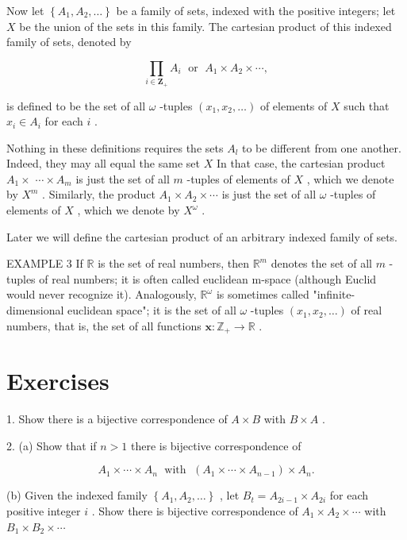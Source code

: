 Now let \(\left\{  {{A}_{1},{A}_{2},\ldots }\right\}\) be a family of sets, indexed with the positive integers; let \(X\) be the union of the sets in this family. The cartesian product of this indexed family of sets, denoted by

\[
\mathop{\prod }\limits_{{i \in  {\mathbf{Z}}_{ + }}}{A}_{i}\;\text{ or }\;{A}_{1} \times  {A}_{2} \times  \cdots ,
\]

is defined to be the set of all \(\omega\) -tuples \(\left( {{x}_{1},{x}_{2},\ldots }\right)\) of elements of \(X\) such that \({x}_{i} \in  {A}_{i}\) for each \(i\) .

Nothing in these definitions requires the sets \({A}_{l}\) to be different from one another. Indeed, they may all equal the same set \(X\) In that case, the cartesian product \({A}_{1} \times\)  \(\cdots  \times  {A}_{m}\) is just the set of all \(m\) -tuples of elements of \(X\) , which we denote by \({X}^{m}\) . Similarly, the product \({A}_{1} \times  {A}_{2} \times  \cdots\) is just the set of all \(\omega\) -tuples of elements of \(X\) , which we denote by \({X}^{\omega }\) .

Later we will define the cartesian product of an arbitrary indexed family of sets.

EXAMPLE 3 If \(\mathbb{R}\) is the set of real numbers, then \({\mathbb{R}}^{m}\) denotes the set of all \(m\) -tuples of real numbers; it is often called euclidean m-space (although Euclid would never recognize it). Analogously, \({\mathbb{R}}^{\omega }\) is sometimes called "infinite-dimensional euclidean space"; it is the set of all \(\omega\) -tuples \(\left( {{x}_{1},{x}_{2},\ldots }\right)\) of real numbers, that is, the set of all functions \(\mathbf{x} : {\mathbb{Z}}_{ + } \rightarrow  \mathbb{R}\) .

\section*{Exercises}

1. Show there is a bijective correspondence of \(A \times  B\) with \(B \times  A\) .

2. (a) Show that if \(n > 1\) there is bijective correspondence of

\[
{A}_{1} \times  \cdots  \times  {A}_{n}\;\text{ with }\;\left( {{A}_{1} \times  \cdots  \times  {A}_{n - 1}}\right)  \times  {A}_{n}.
\]

(b) Given the indexed family \(\left\{  {{A}_{1},{A}_{2},\ldots }\right\}\) , let \({B}_{t} = {A}_{{2i} - 1} \times  {A}_{2i}\) for each positive integer \(i\) . Show there is bijective correspondence of \({A}_{1} \times  {A}_{2} \times  \cdots\) with \({B}_{1} \times  {B}_{2} \times  \cdots\)

